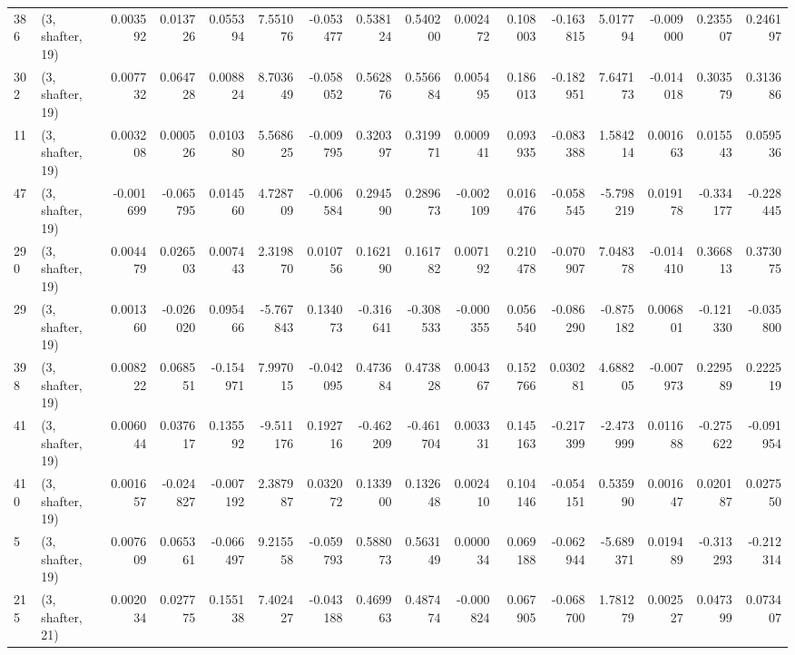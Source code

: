 \begin{tabular}{llrrrrrrrrrrrrrr}
386 &  (3, shafter, 19) &   0.003592 &  0.013726 &  0.055394 &    7.551076 & -0.053477 &   0.538124 &  0.540200 &  0.002472 &  0.108003 & -0.163815 &    5.017794 & -0.009000 &  0.235507 &  0.246197 \\
302 &  (3, shafter, 19) &   0.007732 &  0.064728 &  0.008824 &    8.703649 & -0.058052 &   0.562876 &  0.556684 &  0.005495 &  0.186013 & -0.182951 &    7.647173 & -0.014018 &  0.303579 &  0.313686 \\
11  &  (3, shafter, 19) &   0.003208 &  0.000526 &  0.010380 &    5.568625 & -0.009795 &   0.320397 &  0.319971 &  0.000941 &  0.093935 & -0.083388 &    1.584214 &  0.001663 &  0.015543 &  0.059536 \\
47  &  (3, shafter, 19) &  -0.001699 & -0.065795 &  0.014560 &    4.728709 & -0.006584 &   0.294590 &  0.289673 & -0.002109 &  0.016476 & -0.058545 &   -5.798219 &  0.019178 & -0.334177 & -0.228445 \\
290 &  (3, shafter, 19) &   0.004479 &  0.026503 &  0.007443 &    2.319870 &  0.010756 &   0.162190 &  0.161782 &  0.007192 &  0.210478 & -0.070907 &    7.048378 & -0.014410 &  0.366813 &  0.373075 \\
29  &  (3, shafter, 19) &   0.001360 & -0.026020 &  0.095466 &   -5.767843 &  0.134073 &  -0.316641 & -0.308533 & -0.000355 &  0.056540 & -0.086290 &   -0.875182 &  0.006801 & -0.121330 & -0.035800 \\
398 &  (3, shafter, 19) &   0.008222 &  0.068551 & -0.154971 &    7.997015 & -0.042095 &   0.473684 &  0.473828 &  0.004367 &  0.152766 &  0.030281 &    4.688205 & -0.007973 &  0.229589 &  0.222519 \\
41  &  (3, shafter, 19) &   0.006044 &  0.037617 &  0.135592 &   -9.511176 &  0.192716 &  -0.462209 & -0.461704 &  0.003331 &  0.145163 & -0.217399 &   -2.473999 &  0.011688 & -0.275622 & -0.091954 \\
410 &  (3, shafter, 19) &   0.001657 & -0.024827 & -0.007192 &    2.387987 &  0.032072 &   0.133900 &  0.132648 &  0.002410 &  0.104146 & -0.054151 &    0.535990 &  0.001647 &  0.020187 &  0.027550 \\
5   &  (3, shafter, 19) &   0.007609 &  0.065361 & -0.066497 &    9.215558 & -0.059793 &   0.588073 &  0.563149 &  0.000034 &  0.069188 & -0.062944 &   -5.689371 &  0.019489 & -0.313293 & -0.212314 \\
215 &  (3, shafter, 21) &   0.002034 &  0.027775 &  0.155138 &    7.402427 & -0.043188 &   0.469963 &  0.487474 & -0.000824 &  0.067905 & -0.068700 &    1.781279 &  0.002527 &  0.047399 &  0.073407 \\

\end{tabular}
